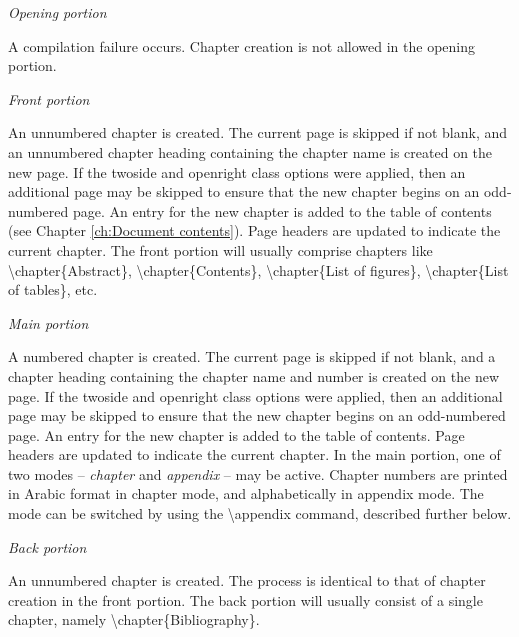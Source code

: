 \documentclass[twoside,openany]{thesis}
\begin{document}
\begin{listing}

\item   {\itshape Opening portion}

        A compilation failure occurs.
        Chapter creation is not allowed in the opening portion.

\item   {\itshape Front portion}

        An unnumbered chapter is created.
        The current page is skipped if not blank, and an unnumbered chapter heading containing the chapter name is created on the new page.
        If the {\ttfamily twoside} and {\ttfamily openright} class options were applied, then an additional page may be skipped to ensure that the new chapter begins on an odd-numbered page.
        An entry for the new chapter is added to the table of contents (see Chapter \ref{ch:Document contents}).
        Page headers are updated to indicate the current chapter.
        The front portion will usually comprise chapters like {\ttfamily\textbackslash chapter\{Abstract\}}, {\ttfamily\textbackslash chapter\{Contents\}}, {\ttfamily\textbackslash chapter\{List of figures\}}, {\ttfamily\textbackslash chapter\{List of tables\}}, etc.

\item   {\itshape Main portion}

        A numbered chapter is created.
        The current page is skipped if not blank, and a chapter heading containing the chapter name and number is created on the new page.
        If the {\ttfamily twoside} and {\ttfamily openright} class options were applied, then an additional page may be skipped to ensure that the new chapter begins on an odd-numbered page.
        An entry for the new chapter is added to the table of contents.
        Page headers are updated to indicate the current chapter.
        In the main portion, one of two modes -- {\itshape chapter} and {\itshape appendix} -- may be active.
        Chapter numbers are printed in Arabic format in chapter mode, and alphabetically in appendix mode.
        The mode can be switched by using the {\ttfamily\textbackslash appendix} command, described further below.

\item   {\itshape Back portion}

        An unnumbered chapter is created.
        The process is identical to that of chapter creation in the front portion.
        The back portion will usually consist of a single chapter, namely {\ttfamily\textbackslash chapter\{Bibliography\}}.

\end{listing}
\end{document}
